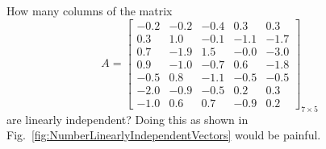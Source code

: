 \begin{example} 
\label{ex:WithoutSemiProtip01} How many columns of the matrix 
\begin{equation}
\label{eq:WowCanWeAnalyzeThis}
A=\left[
\begin{array}{rrrrr}
-0.2 & -0.2 & -0.4 & 0.3 & 0.3 \\
0.3 & 1.0 & -0.1 & -1.1 & -1.7 \\
0.7 & -1.9 & 1.5 & -0.0 & -3.0 \\
0.9 & -1.0 & -0.7 & 0.6 & -1.8 \\
-0.5 & 0.8 & -1.1 & -0.5 & -0.5 \\
-2.0 & -0.9 & -0.5 & 0.2 & 0.3 \\
-1.0 & 0.6 & 0.7 & -0.9 & 0.2
\end{array}
\right]_{7 \times 5}
\end{equation}
are linearly independent? Doing this as shown in Fig.~\ref{fig:NumberLinearlyIndependentVectors} would be painful. 
\end{example}

